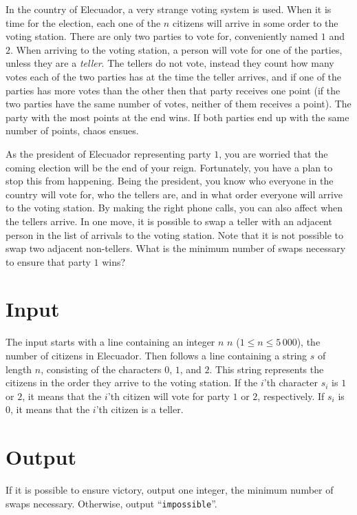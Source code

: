 
In the country of Elecuador, a very strange voting system is used. When
it is time for the election, each one of the $n$ citizens will arrive
in some order to the voting station.  There are only two parties to
vote for, conveniently named $1$ and $2$. When arriving to the voting station, a person
will vote for one of the parties, unless they are a \textit{teller}. 
The tellers do not vote, instead they count
how many votes each of the two parties has at the time the teller arrives,
and if one of the parties has more votes than the other then that party receives one point
(if the two parties have the same number of votes, neither of them receives a point).
The party with the most points at the end wins. If both parties end up with
the same number of points, chaos ensues.

As the president of Elecuador representing party $1$, you are worried
that the coming election will be the end of your reign. Fortunately,
you have a plan to stop this from happening.  Being the president, you
know who everyone in the country will vote for, who the tellers are,
and in what order everyone will arrive to the voting station. By
making the right phone calls, you can also affect when the tellers
arrive. In one move, it is possible to swap a teller with an adjacent
person in the list of arrivals to the voting station. Note that it is
not possible to swap two adjacent non-tellers. What is the minimum
number of swaps necessary to ensure that party $1$ wins?

\section*{Input}
The input starts with a line containing an integer $n$ $n$ ($1 \le n \le 5\,000$), the number of citizens in Elecuador.
Then follows a line containing a string $s$ of length $n$, consisting
of the characters $0$, $1$, and $2$. This string represents the
citizens in the order they arrive to the voting station. If the $i$'th
character $s_i$ is $1$ or $2$, it means that the $i$'th citizen will
vote for party $1$ or $2$, respectively. If $s_i$ is $0$, it means
that the $i$'th citizen is a teller.

\section*{Output}
    If it is possible to ensure victory, output one integer, the minimum number of swaps necessary.
    Otherwise, output ``\texttt{impossible}''.


